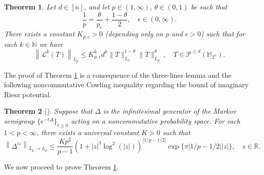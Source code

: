 \documentclass{amsbook}
\newtheorem{theorem}{Theorem}[chapter]
\theoremstyle{definition}
\theoremstyle{remark}
\numberwithin{section}{chapter}
\numberwithin{equation}{chapter}
\newcommand{\1}{\mathbf{1}}
\begin{document}
\begin{theorem}\label{lower degree estimate}
Let $d\in [n]$, and let $p\in(1,\infty)$,  $\theta\in(0,1)$  be such that
\[
\frac{1}{p}=\frac{\theta}{p_{\epsilon}}+\frac{1-\theta}{2},\quad \epsilon\in (0,\infty).
\]
There exists a constant $K_{p,\epsilon}>0$ (depending only on $p$ and $\epsilon>0$) such that for each $k\in \mathbb{N}$ we have
\begin{equation}\label{bound for lower degree}
\left\|\mathcal{L}^{k}(T)\right\|_{L_p}\leq K_{p,\epsilon}^{k}d^{k}\|T\|^{1-\theta}_{L_2}\|T\|^{\theta}_{L_{p_{\epsilon}}},\quad T\in \mathcal{P}^{\leq d}(\mathbb{M}_{2^n}).
\end{equation}
\end{theorem}

The proof of Theorem \ref{lower degree estimate} is a consequence of the three-lines lemma and the following noncommutative Cowling inequality  regarding the bound of imaginary Riesz potential.
\begin{theorem}[{\cite{JW2017}}]\label{imaginary power}
Suppose that $\Delta$ is the infinitesimal generator of the Markov semigroup $\{e^{-t\Delta}\}_{t\geq 0}$ acting on a noncommutative probability space. For each $1<p<\infty$, there exists a universal constant $K>0$ such that
\[
\left\|\Delta^{iz}\right\|_{L_{p}\to L_{p}}\leq \frac{Kp^{2}}{p-1}(1+|z|^{3}\log^{2}(|z|))^{|1/p-1/2|}\exp\{\pi|1/p-1/2||z|\},\quad z\in \mathbb{R}.
\]
\end{theorem}

We now proceed to prove Theorem \ref{lower degree estimate}.
\end{document}
